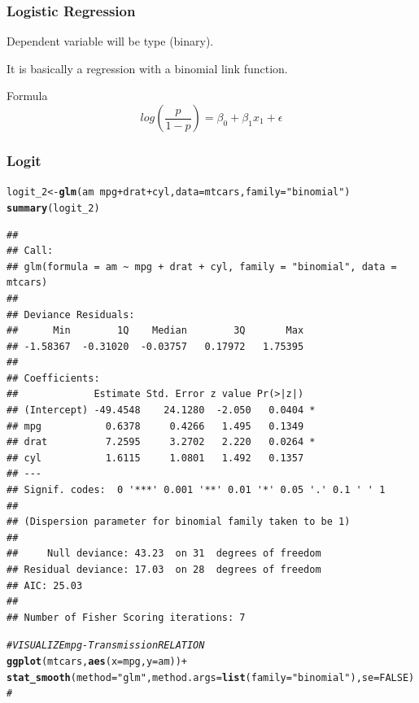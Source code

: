 \documentclass{beamer}\usepackage[]{graphicx}\usepackage[]{color}
\makeatletter
\newcommand{\hlnum}[1]{\textcolor[rgb]{0.686,0.059,0.569}{#1}}%
\newcommand{\hlstr}[1]{\textcolor[rgb]{0.192,0.494,0.8}{#1}}%
\newcommand{\hlcom}[1]{\textcolor[rgb]{0.678,0.584,0.686}{\textit{#1}}}%
\newcommand{\hlopt}[1]{\textcolor[rgb]{0,0,0}{#1}}%
\newcommand{\hlstd}[1]{\textcolor[rgb]{0.345,0.345,0.345}{#1}}%
\newcommand{\hlkwb}[1]{\textcolor[rgb]{0.69,0.353,0.396}{#1}}%
\newcommand{\hlkwc}[1]{\textcolor[rgb]{0.333,0.667,0.333}{#1}}%
\newcommand{\hlkwd}[1]{\textcolor[rgb]{0.737,0.353,0.396}{\textbf{#1}}}%
\newenvironment{kframe}{%
 \def\at@end@of@kframe{}%
 \ifinner\ifhmode%
  \def\at@end@of@kframe{\end{minipage}}%
  \begin{minipage}{\columnwidth}%
 \fi\fi%
 \def\FrameCommand##1{\hskip\@totalleftmargin \hskip-\fboxsep
 \colorbox{shadecolor}{##1}\hskip-\fboxsep
     \hskip-\linewidth \hskip-\@totalleftmargin \hskip\columnwidth}%
 \MakeFramed {\advance\hsize-\width
   \@totalleftmargin\z@ \linewidth\hsize
   \@setminipage}}%
 {\par\unskip\endMakeFramed%
 \at@end@of@kframe}
\newenvironment{knitrout}{}{} %
\makeatother
\begin{document}
\begin{frame}
\frametitle{Logistic Regression}

Dependent variable will be type (binary). \vfill

It is basically a regression with a binomial link function. \vfill

\begin{alertblock}{Formula}
\[
log \left(\frac{p}{1-p} \right) = \beta_0 + \beta_1 x_1 + \epsilon
\]
\end{alertblock}

\end{frame}


\begin{frame}
\frametitle{Logit}


\begin{knitrout}\tiny
{}\color{fgcolor}\begin{kframe}
\begin{alltt}
\hlstd{logit_2} \hlkwb{<-} \hlkwd{glm}\hlstd{(am} \hlopt{~} \hlstd{mpg} \hlopt{+} \hlstd{drat} \hlopt{+} \hlstd{cyl,} \hlkwc{data} \hlstd{= mtcars,} \hlkwc{family} \hlstd{=} \hlstr{"binomial"}\hlstd{)}
\hlkwd{summary}\hlstd{(logit_2)}
\end{alltt}
\begin{verbatim}
## 
## Call:
## glm(formula = am ~ mpg + drat + cyl, family = "binomial", data = mtcars)
## 
## Deviance Residuals: 
##      Min        1Q    Median        3Q       Max  
## -1.58367  -0.31020  -0.03757   0.17972   1.75395  
## 
## Coefficients:
##             Estimate Std. Error z value Pr(>|z|)  
## (Intercept) -49.4548    24.1280  -2.050   0.0404 *
## mpg           0.6378     0.4266   1.495   0.1349  
## drat          7.2595     3.2702   2.220   0.0264 *
## cyl           1.6115     1.0801   1.492   0.1357  
## ---
## Signif. codes:  0 '***' 0.001 '**' 0.01 '*' 0.05 '.' 0.1 ' ' 1
## 
## (Dispersion parameter for binomial family taken to be 1)
## 
##     Null deviance: 43.23  on 31  degrees of freedom
## Residual deviance: 17.03  on 28  degrees of freedom
## AIC: 25.03
## 
## Number of Fisher Scoring iterations: 7
\end{verbatim}
\end{kframe}
\end{knitrout}

\begin{knitrout}\scriptsize
{}\color{fgcolor}\begin{kframe}
\begin{alltt}
\hlcom{# VISUALIZE mpg - Transmission RELATION}
\hlkwd{ggplot}\hlstd{(mtcars,} \hlkwd{aes}\hlstd{(}\hlkwc{x} \hlstd{= mpg,} \hlkwc{y} \hlstd{= am))} \hlopt{+}
        \hlkwd{stat_smooth}\hlstd{(}\hlkwc{method}\hlstd{=}\hlstr{"glm"}\hlstd{,} \hlkwc{method.args} \hlstd{=} \hlkwd{list}\hlstd{(}\hlkwc{family}\hlstd{=}\hlstr{"binomial"}\hlstd{),} \hlkwc{se}\hlstd{=}\hlnum{FALSE}\hlstd{)} \hlcom{#}
\end{alltt}
\end{kframe}


\end{knitrout}
\end{frame}
\end{document}
